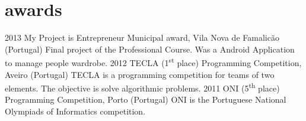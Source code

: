 \documentclass[]{friggeri-cv} %
\begin{document}
\section{awards}

\begin{entrylist}
\entry
{2013}
{My Project is Entrepreneur}
{Municipal award, Vila Nova de Famalicão (Portugal)}
{Final project of the Professional Course. Was a Android Application to manage people wardrobe.}
\entry
{2012}
{TECLA (1\textsuperscript{st} place)}
{Programming Competition, Aveiro (Portugal)}
{TECLA is a programming competition for teams of two elements. The objective is solve algorithmic problems.}
\entry
{2011}
{ONI (5\textsuperscript{th} place)}
{Programming Competition, Porto (Portugal)}
{ONI is the Portuguese National Olympiads of Informatics competition.}

\end{entrylist}

\end{document}
